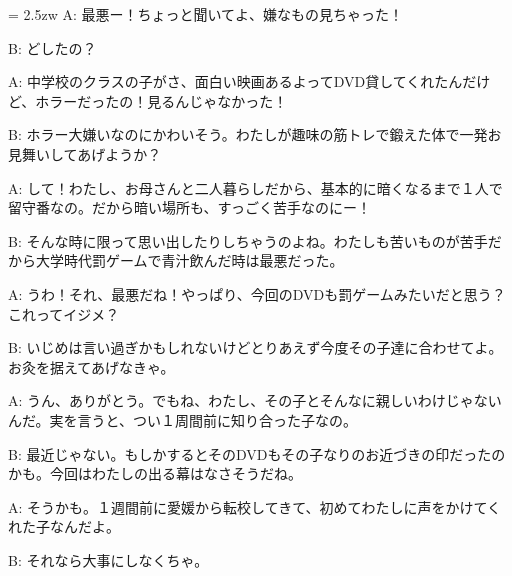 \documentclass[11pt]{amsart}
\title{}
\author{}
\newenvironment{hangall}[1]{\hangindent = 2.5zw\everypar{\hangindent = 2.5zw}}{}
\begin{document}
\maketitle
\begin{hangall}{}%
A: 最悪ー！ちょっと聞いてよ、嫌なもの見ちゃった！

B: どしたの？

A: 中学校のクラスの子がさ、面白い映画あるよってDVD貸してくれたんだけど、ホラーだったの！見るんじゃなかった！

B: ホラー大嫌いなのにかわいそう。わたしが趣味の筋トレで鍛えた体で一発お見舞いしてあげようか？

A: して！わたし、お母さんと二人暮らしだから、基本的に暗くなるまで１人で留守番なの。だから暗い場所も、すっごく苦手なのにー！

B: そんな時に限って思い出したりしちゃうのよね。わたしも苦いものが苦手だから大学時代罰ゲームで青汁飲んだ時は最悪だった。

A: うわ！それ、最悪だね！やっぱり、今回のDVDも罰ゲームみたいだと思う？これってイジメ？

B: いじめは言い過ぎかもしれないけどとりあえず今度その子達に合わせてよ。お灸を据えてあげなきゃ。

A: うん、ありがとう。でもね、わたし、その子とそんなに親しいわけじゃないんだ。実を言うと、つい１周間前に知り合った子なの。

B: 最近じゃない。もしかするとそのDVDもその子なりのお近づきの印だったのかも。今回はわたしの出る幕はなさそうだね。

A: そうかも。１週間前に愛媛から転校してきて、初めてわたしに声をかけてくれた子なんだよ。

B: それなら大事にしなくちゃ。
\end{hangall}
\end{document}
